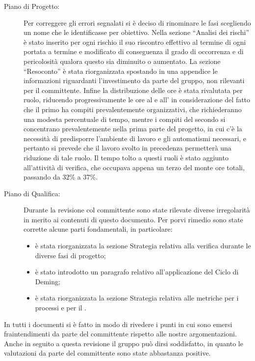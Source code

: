 \begin{description}
			\item[Piano di Progetto:] Per correggere gli errori segnalati si è deciso di rinominare le fasi scegliendo un nome che le identificasse per obiettivo. Nella sezione “Analisi dei rischi” è stato inserito per ogni rischio il suo riscontro effettivo al termine di ogni  portata a termine e modificato di conseguenza il grado di occorrenza e di pericolosità qualora questo sia diminuito o aumentato. La sezione “Resoconto” è stata riorganizzata spostando in una appendice le informazioni riguardanti l'investimento da parte del gruppo, non rilevanti per il committente. Infine la distribuzione delle ore è stata rivalutata per ruolo, riducendo progressivamente le ore al  e all' in considerazione del fatto che il primo ha compiti prevalentemente organizzativi, che richiederanno una modesta percentuale di tempo, mentre i compiti del secondo si concentrano prevalentemente nella prima parte del progetto, in cui c'è la necessità di predisporre l'ambiente di lavoro e gli automatismi necessari, e pertanto si prevede che il lavoro svolto in precedenza permetterà una riduzione di tale ruolo. Il tempo tolto a questi ruoli è stato aggiunto all'attività di verifica, che occupava appena un terzo del monte ore totali, passando da 32\% a 37\%.
			\item[Piano di Qualifica:] Durante la revisione col committente sono state rilevate diverse irregolarità in merito ai contenuti di questo documento. Per porvi rimedio sono state corrette alcune parti fondamentali, in particolare:
			\begin{itemize}
				\item è stata riorganizzata la sezione Strategia relativa alla verifica durante le diverse fasi di progetto;
				\item è stato introdotto un paragrafo relativo all'applicazione del Ciclo di Deming;
				\item è stata riorganizzata la sezione Strategia relativa alle metriche per i processi e per il .
			\end{itemize}
		\end{description}
		In tutti i documenti si è fatto in modo di rivedere i punti in cui sono emersi fraintendimenti da parte del committente rispetto alle nostre argomentazioni.
		Anche in seguito a questa revisione il gruppo può dirsi soddisfatto, in quanto le valutazioni da parte del committente sono state abbastanza positive.\\
